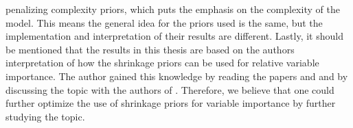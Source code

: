 penalizing complexity priors, which puts the emphasis on the complexity of the model. This means the general idea for the priors used is the same, but the implementation and interpretation of their results are different. Lastly, it should be mentioned that the results in this thesis are based on the authors interpretation of how the shrinkage priors can be used for relative variable importance. The author gained this knowledge by reading the papers \citet{zhang2020bayesian} and \citet{aguilar2024generalized} and by discussing the topic with the authors of \citet{aguilar2024generalized}. Therefore, we believe that one could further optimize the use of shrinkage priors for variable importance by further studying the topic.
